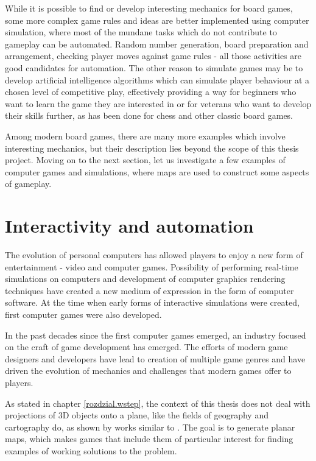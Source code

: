 \documentclass[12pt]{report}
\begin{document}
While it is possible to find or develop interesting mechanics for board games, some more complex game rules and ideas are better implemented using computer simulation, where most of the mundane tasks which do not contribute to gameplay can be automated. Random number generation, board preparation and arrangement, checking player moves against game rules - all those activities are good candidates for automation. The other reason to simulate games may be to develop artificial intelligence algorithms which can simulate player behaviour at a chosen level of competitive play, effectively providing a way for beginners who want to learn the game they are interested in or for veterans who want to develop their skills further, as has been done for chess and other classic board games. 

Among modern board games, there are many more examples which involve interesting mechanics, but their description lies beyond the scope of this thesis project. Moving on to the next section, let us investigate a few examples of computer games and simulations, where maps are used to construct some aspects of gameplay.

\section{ Interactivity and automation }

The evolution of personal computers has allowed players to enjoy a new form of entertainment - video and computer games. Possibility of performing real-time simulations on computers and development of computer graphics rendering techniques have created a new medium of expression in the form of computer software. At the time when early forms of interactive simulations were created, first computer games were also developed. 

In the past decades since the first computer games emerged, an industry focused on the craft of game development has emerged. The efforts of modern game designers and developers have lead to creation of multiple game genres and have driven the evolution of mechanics and challenges that modern games offer to players.

As stated in chapter \ref{rozdzial.wstep}, the context of this thesis does not deal with projections of 3D objects onto a plane, like the fields of geography and cartography do, as shown by works similar to \autocite{snyder1993flattening}. The goal is to generate planar maps, which makes games that include them of particular interest for finding examples of working solutions to the problem. 
\end{document}
